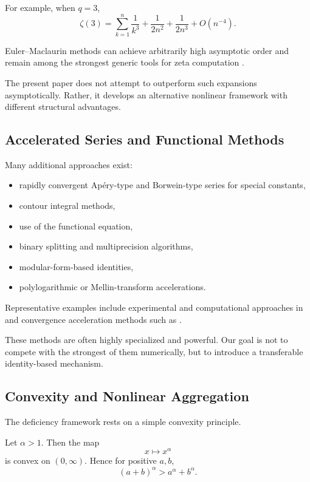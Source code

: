 \documentclass[11pt]{article}
\numberwithin{equation}{section}
\theoremstyle{definition}
\begin{document}
For example, when \(q=3\),
\[
\zeta(3)
=
\sum_{k=1}^{n}\frac1{k^3}
+
\frac{1}{2n^2}
+
\frac{1}{2n^3}
+
O(n^{-4}).
\]

Euler--Maclaurin methods can achieve arbitrarily high asymptotic order and remain among the strongest generic tools for zeta computation \cite{olver2010nist,whittakerwatson1996}.

The present paper does not attempt to outperform such expansions asymptotically. Rather, it develops an alternative nonlinear framework with different structural advantages.

\subsection{Accelerated Series and Functional Methods}

Many additional approaches exist:

\begin{itemize}
\item rapidly convergent Apéry-type and Borwein-type series for special constants,
\item contour integral methods,
\item use of the functional equation,
\item binary splitting and multiprecision algorithms,
\item modular-form-based identities,
\item polylogarithmic or Mellin-transform accelerations.
\end{itemize}

Representative examples include experimental and computational approaches in \cite{borwein2013pi} and convergence acceleration methods such as \cite{cohen2000computational}.

These methods are often highly specialized and powerful. Our goal is not to compete with the strongest of them numerically, but to introduce a transferable identity-based mechanism.

\subsection{Convexity and Nonlinear Aggregation}

The deficiency framework rests on a simple convexity principle.

Let \(\alpha>1\). Then the map
\[
x\mapsto x^\alpha
\]
is convex on \((0,\infty)\). Hence for positive \(a,b\),
\[
(a+b)^\alpha>a^\alpha+b^\alpha.
\]
\end{document}
